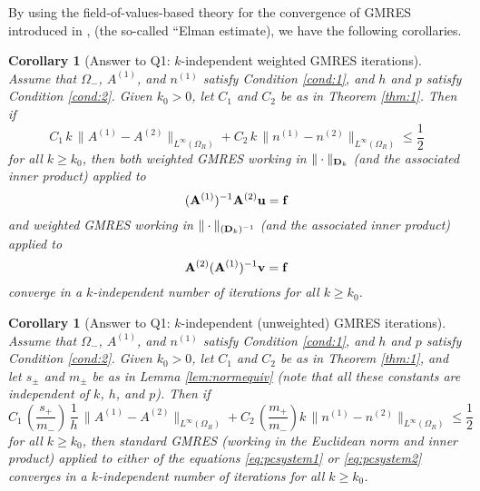 \documentclass[10pt]{article}%
\newtheorem{corollary}[theorem]{Corollary}
\numberwithin{equation}{section}
\newcommand{\beq}{\begin{equation}}
\newcommand{\eeq}{\end{equation}}
\newcommand{\beqs}{\begin{equation*}}
\newcommand{\eeqs}{\end{equation*}}
\newcommand{\bv}{\mathbf{v}}
\newcommand{\bu}{\mathbf{u}}
\newcommand{\bff}{\mathbf{f}}
\newcommand{\Oi}{{\Omega_-}}
\newcommand{\matrixA}{{\bf A}}
\newcommand{\matrixD}{{\bf D}}
\newcommand{\coeffAo}{A^{(1)}}
\newcommand{\coeffAt}{A^{(2)}}
\newcommand{\coeffno}{n^{(1)}}
\newcommand{\coeffnt}{n^{(2)}}
\begin{document}
By using the field-of-values-based theory for the convergence of GMRES introduced in \cite{El:82}, \cite{EiElSc:83} (the so-called ``Elman estimate), we have the following corollaries.

\begin{corollary}[Answer to Q1: $k$-independent weighted GMRES iterations]\label{cor:1}
Assume that $\Oi$, $\coeffAo$, and $\coeffno$ satisfy Condition \ref{cond:1}, and $h$ and $p$ satisfy Condition \ref{cond:2}. Given $k_0>0$,
let $C_1$ and $C_2$ be as in Theorem \ref{thm:1}. Then if 
\beq\label{eq:cond}
C_1 \,k \,\big\|\coeffAo-\coeffAt\big\|_{L^\infty(\Omega_R)} +C_2 \, k\, \big\|\coeffno-\coeffnt\big\|_{L^\infty(\Omega_R)}
\leq \frac{1}{2}
\eeq
for all $k\geq k_0$, then \emph{both} weighted GMRES working in $\|\cdot\|_{\matrixD_k}$ (and the associated inner product) applied to 
\beq\label{eq:pcsystem1}
(\matrixA^{(1)})^{-1}\matrixA^{(2)}\bu = \bff
\eeq
\emph{and} weighted GMRES working in $\|\cdot\|_{(\matrixD_k)^{-1}}$ (and the associated inner product) applied to 
\beq\label{eq:pcsystem2}
\matrixA^{(2)}(\matrixA^{(1)})^{-1}\bv = \bff
\eeq
 converge in a $k$-independent number of iterations for all $k\geq k_0$.
\end{corollary}

\begin{corollary}[Answer to Q1: $k$-independent (unweighted) GMRES iterations]\label{cor:1a}
Assume that $\Oi$, $\coeffAo$, and $\coeffno$ satisfy Condition \ref{cond:1}, and $h$ and $p$ satisfy Condition \ref{cond:2}. Given $k_0>0$,
let $C_1$ and $C_2$ be as in Theorem \ref{thm:1}, and let $s_{\pm}$ and $m_{\pm}$ be as in Lemma \ref{lem:normequiv} (note that all these constants are independent of $k$, $h$, and $p$). Then if 
\beq\label{eq:conda}
 C_1 \,\left(\frac{s_+}{m_-}\right) \,\frac{1}{h} \,
\big\|\coeffAo-\coeffAt\big\|_{L^\infty(\Omega_R)} + C_2 \, \left(\frac{m_+}{m_-} \right)k \, \big\|\coeffno-\coeffnt\big\|_{L^\infty(\Omega_R)}
\leq \frac{1}{2}
\eeq
for all $k\geq k_0$, then standard GMRES (working in the Euclidean norm and inner product) applied to either of the equations \eqref{eq:pcsystem1} or \eqref{eq:pcsystem2}
 converges in a $k$-independent number of iterations for all $k\geq k_0$.
\end{corollary}
\end{document}
